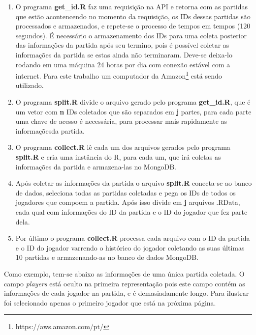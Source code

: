 \documentclass[
12pt,				%
openright,			%
oneside,			%
a4paper,			%
english,			%
brazil,				%
]{abntex2}
\begin{document}
\begin{enumerate}
\item O programa \textbf{get\_id.R} faz uma requisição na API e retorna com as
  partidas que estão acontencendo no momento da requisição, os IDs dessas
  partidas são processados e armazenados, e repete-se o processo de tempos em
  tempos (120 segundos). É necessário o armazenamento dos IDs para uma coleta
  posterior das informações da partida após seu termino, pois é possível
  coletar as informações da partida se estas ainda não terminaram. Deve-se
  deixa-lo rodando em uma máquina 24 horas por dia com conexão estável com a
  internet. Para este trabalho um computador da
  Amazon\footnote{https://aws.amazon.com/pt/} está sendo utilizado.

\item O programa \textbf{split.R} divide o arquivo  gerado pelo programa
  \textbf{get\_id.R}, que é um vetor com \textbf{n} IDs coletados que são
  separados em \textbf{j} partes, para cada parte uma chave de acesso é
  necessária, para processar mais rapidamente as informaçõesda partida.

\item O programa \textbf{collect.R} lê cada um dos arquivos gerados pelo
  programa \textbf{split.R} e cria uma instância do R, para cada um, que irá
  coletas as informações da partida e armazena-las no MongoDB.

\item Após coletar as informações da partida o arquivo \textbf{split.R}
  conecta-se ao banco de dados, seleciona todas as partidas coletadas e pega os
  IDs de todos os jogadores que compoem a partida. Após isso divide em
  \textbf{j} arquivos .RData, cada qual com informações do ID da partida e o ID
  do jogador que fez parte dela.

\item Por último o programa \textbf{collect.R} processa cada arquivo com o ID da
  partida e o ID do jogador varrendo o histórico do jogador coletando as suas
  últimas 10 partidas e armazenando-as no banco de dados MongoDB.
  
\end{enumerate}

Como exemplo, tem-se abaixo as informações de uma única partida coletada. O
campo \emph{players} está oculto na primeira representação pois este campo
contém as informações de cada jogador na partida, e é demasiadamente longo.
Para ilustrar foi selecionado apenas o primeiro jogador que está na próxima
página.
\end{document}
